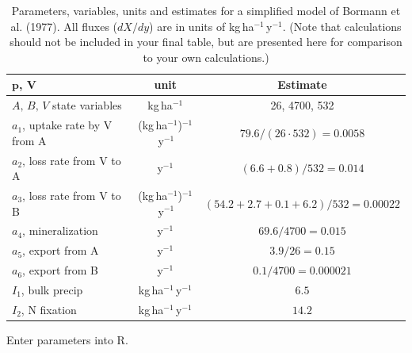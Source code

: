 \documentclass[
]{book}
\begin{document}
\begin{table}
\caption{Parameters, variables, units and estimates for a simplified model of Bormann et al. (1977). All fluxes ($dX/dy$) are in units of kg\,ha$^{-1}$\,y$^{-1}$. (Note that calculations should not be included in your final table, but are presented here for comparison to your own calculations.) } 
\begin{tabular}{lcc} \hline \hline
$\mathbf{p}$, $\mathbf{V}$ & \textbf{unit} & \textbf{Estimate}\\ 
\hline
$A,\,B,\,V$ state variables & kg\,ha$^{-1}$ & 26, 4700, 532\\
$a_1$, uptake rate by V from A & (kg\,ha$^{-1}$)$^{-1}$\,y$^{-1}$  &  $79.6 / (26 \cdot 532) = 0.0058$\\
$a_2$, loss rate from V to A & y$^{-1}$ & $(6.6 + 0.8) / 532 = 0.014 $ \\
$a_3$, loss rate from V to B & (kg\,ha$^{-1}$)$^{-1}$\,y$^{-1}$ & $(54.2 + 2.7 + 0.1 + 6.2 ) / 532 = 0.00022 $ \\
$a_4$, mineralization & y$^{-1}$ & $ 69.6 / 4700 = 0.015$ \\
$a_5$, export from A & y$^{-1} $ & $ 3.9 /26 = 0.15$ \\
$a_6$, export from B & y$^{-1}$ & $0.1/4700 = 0.000021$ \\
$I_1$, bulk precip & kg\,ha$^{-1}$\,y$^{-1}$ & $ 6.5$ \\
$I_2$, N fixation & kg\,ha$^{-1}$\,y$^{-1}$ & $14.2$ 
\end{tabular}
\end{table}

Enter parameters into R.
\end{document}
